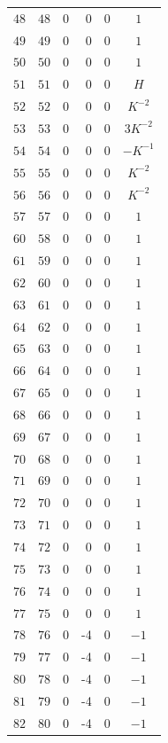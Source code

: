 {\begin{longtable}{@{}r r r r r c@{}}
\(48\) & \(48\) & 0 & 0 & 0 & \(1\) \\
\(49\) & \(49\) & 0 & 0 & 0 & \(1\) \\
\(50\) & \(50\) & 0 & 0 & 0 & \(1\) \\
\(51\) & \(51\) & 0 & 0 & 0 & \(H\) \\
\(52\) & \(52\) & 0 & 0 & 0 & \(K^{-2}\) \\
\(53\) & \(53\) & 0 & 0 & 0 & \(3K^{-2}\) \\
\(54\) & \(54\) & 0 & 0 & 0 & \(-K^{-1}\) \\
\(55\) & \(55\) & 0 & 0 & 0 & \(K^{-2}\) \\
\(56\) & \(56\) & 0 & 0 & 0 & \(K^{-2}\) \\
\(57\) & \(57\) & 0 & 0 & 0 & \(1\) \\
\(60\) & \(58\) & 0 & 0 & 0 & \(1\) \\
\(61\) & \(59\) & 0 & 0 & 0 & \(1\) \\
\(62\) & \(60\) & 0 & 0 & 0 & \(1\) \\
\(63\) & \(61\) & 0 & 0 & 0 & \(1\) \\
\(64\) & \(62\) & 0 & 0 & 0 & \(1\) \\
\(65\) & \(63\) & 0 & 0 & 0 & \(1\) \\
\(66\) & \(64\) & 0 & 0 & 0 & \(1\) \\
\(67\) & \(65\) & 0 & 0 & 0 & \(1\) \\
\(68\) & \(66\) & 0 & 0 & 0 & \(1\) \\
\(69\) & \(67\) & 0 & 0 & 0 & \(1\) \\
\(70\) & \(68\) & 0 & 0 & 0 & \(1\) \\
\(71\) & \(69\) & 0 & 0 & 0 & \(1\) \\
\(72\) & \(70\) & 0 & 0 & 0 & \(1\) \\
\(73\) & \(71\) & 0 & 0 & 0 & \(1\) \\
\(74\) & \(72\) & 0 & 0 & 0 & \(1\) \\
\(75\) & \(73\) & 0 & 0 & 0 & \(1\) \\
\(76\) & \(74\) & 0 & 0 & 0 & \(1\) \\
\(77\) & \(75\) & 0 & 0 & 0 & \(1\) \\
\(78\) & \(76\) & 0 & -4 & 0 & \(-1\) \\
\(79\) & \(77\) & 0 & -4 & 0 & \(-1\) \\
\(80\) & \(78\) & 0 & -4 & 0 & \(-1\) \\
\(81\) & \(79\) & 0 & -4 & 0 & \(-1\) \\
\(82\) & \(80\) & 0 & -4 & 0 & \(-1\) \\

\end{longtable}}
